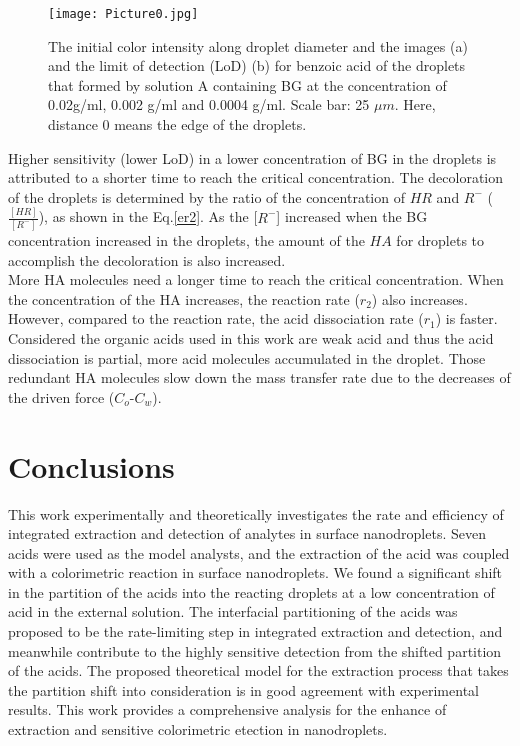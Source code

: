 \documentclass[journal=langd5,manuscript=article]{achemso}
\begin{document}
\begin{figure}[htp]
	\texttt{[image: Picture0.jpg]}
	\caption{The initial color intensity along droplet diameter and the images (a) and the limit of detection (LoD) (b) for benzoic acid of the droplets that formed by solution A containing BG at the concentration of 0.02g/ml, 0.002 g/ml and 0.0004 g/ml. Scale bar: 25 $\mu m$. Here, distance 0 means the edge of the droplets.}
	\label{fx00}
\end{figure}

Higher sensitivity (lower LoD) in a lower concentration of BG in the droplets is attributed to a shorter time to reach the critical concentration. The decoloration of the droplets is determined by the ratio of the concentration of $HR$ and $R^-$ ($\frac{[HR]}{[R^-]}$), as shown in the Eq.\ref{er2}. As the [$R^-$] increased when the BG concentration increased in the droplets, the amount of the $HA$ for droplets to accomplish the decoloration is also increased.\\
More HA molecules need a longer time to reach the critical concentration. When the concentration of the HA increases, the reaction rate ($r_2$) also increases. However, compared to the reaction rate, the acid dissociation rate ($r_1$) is faster.\cite{park2006dissociation} Considered the organic acids used in this work are weak acid and thus the acid dissociation is partial, more acid molecules accumulated in the droplet. Those redundant HA molecules slow down the mass transfer rate due to the decreases of the driven force ($C_o$-$C_w$). 




\section{Conclusions}

This work experimentally and theoretically investigates the rate and efficiency of integrated extraction and detection of analytes in surface nanodroplets. Seven acids were used as the model analysts, and the extraction of the acid was coupled with a colorimetric reaction in surface nanodroplets. We found a significant shift in the partition of the acids into the reacting droplets at a low concentration of acid in the external solution.  The interfacial partitioning of the acids was proposed to be the rate-limiting step in integrated extraction and detection, and meanwhile contribute to the highly sensitive detection from the shifted partition of the acids.  The proposed theoretical model for the extraction process that takes the partition shift into consideration is in good agreement with experimental results. This work provides a comprehensive analysis for the enhance of extraction and sensitive colorimetric etection in nanodroplets.  
\end{document}

